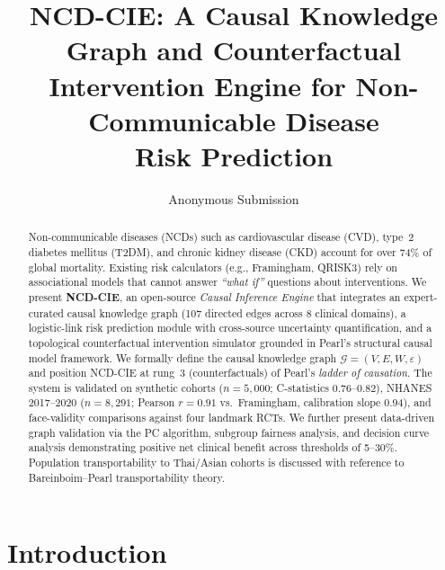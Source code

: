\documentclass[runningheads]{llncs}
\begin{document}
\title{NCD-CIE: A Causal Knowledge Graph and Counterfactual\\Intervention Engine for Non-Communicable Disease\\Risk Prediction}

\author{Anonymous Submission}

\maketitle

\begin{abstract}
Non-communicable diseases (NCDs) such as cardiovascular disease (CVD),
type~2 diabetes mellitus (T2DM), and chronic kidney disease (CKD)
account for over 74\% of global mortality.  Existing risk calculators
(e.g., Framingham, QRISK3) rely on associational models that
cannot answer \emph{``what if''} questions about interventions.  We
present \textbf{NCD-CIE}, an open-source \emph{Causal Inference
Engine} that integrates an expert-curated causal knowledge graph (107
directed edges across 8 clinical domains), a logistic-link risk
prediction module with cross-source uncertainty quantification, and a
topological counterfactual intervention simulator grounded in Pearl's
structural causal model framework.  We formally define the causal
knowledge graph $\mathcal{G}=(V,E,W,\varepsilon)$ and position
NCD-CIE at rung~3 (counterfactuals) of Pearl's \emph{ladder of
causation}.  The system is validated on synthetic cohorts
($n=5{,}000$; C-statistics 0.76--0.82), NHANES 2017--2020
($n=8{,}291$; Pearson $r=0.91$ vs.\ Framingham, calibration slope
0.94), and face-validity comparisons against four landmark RCTs.  We
further present data-driven graph validation via the PC algorithm,
subgroup fairness analysis, and decision curve analysis demonstrating
positive net clinical benefit across thresholds of 5--30\%.
Population transportability to Thai/Asian cohorts is discussed with
reference to Bareinboim--Pearl transportability theory.

\end{abstract}

\section{Introduction}\label{sec:intro}
\end{document}
